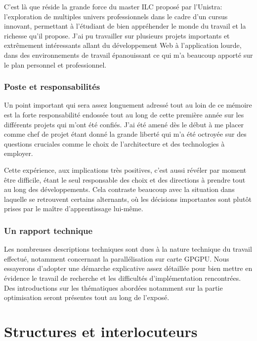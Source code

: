 \documentclass[french, 11pt]{memoir}
\begin{document}
C'est là que réside la grande force du master ILC proposé par l'Unistra:
l'exploration de multiples univers professionnels dans le cadre d'un
cursus innovant, permettant à l'étudiant de bien appréhender le monde du
travail et la richesse qu'il propose. J'ai pu travailler sur plusieurs
projets importants et extrêmement intéressants allant du développement
Web à l'application lourde, dans des environnements de travail
épanouissant ce qui m'a beaucoup apporté sur le plan personnel et
professionnel.

\subsubsection{Poste et
	responsabilités}\label{poste-et-responsabilituxe9s}

Un point important qui sera assez longuement adressé tout au loin de ce
mémoire est la forte responsabilité endossée tout au long de cette
première année sur les différents projets qui m'ont été confiés. J'ai
été amené dès le début à me placer comme chef de projet étant donné la
grande liberté qui m'a été octroyée sur des questions cruciales comme le
choix de l'architecture et des technologies à employer.

Cette expérience, aux implications très positives, c'est aussi révéler
par moment être difficile, étant le seul responsable des choix et des
directions à prendre tout au long des développements. Cela contraste
beaucoup avec la situation dans laquelle se retrouvent certains
alternants, où les décisions importantes sont plutôt prises par le
maître d'apprentissage lui-même.

\subsubsection{Un rapport technique}\label{un-rapport-technique}

Les nombreuses descriptions techniques sont dues à la nature technique
du travail effectué, notamment concernant la parallélisation sur carte
GPGPU. Nous essayerons d'adopter une démarche explicative assez
détaillée pour bien mettre en évidence le travail de recherche et les
difficultés d'implémentation rencontrées. Des introductions sur les
thématiques abordées notamment sur la partie optimisation seront
présentes tout au long de l'exposé.

\section{Structures et
	interlocuteurs}\label{structures-et-interlocuteurs}
\end{document}
